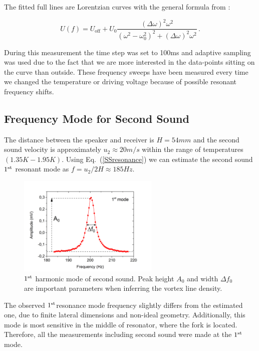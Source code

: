 The fitted full lines are Lorentzian curves with the general formula from \cite{forks}:

\begin{equation}
U(f) = U_{\text{off}} + U_0 \frac{(\Delta \omega)^2 \omega^2}{(\omega^2-\omega_0^2)^2 + (\Delta \omega)^2 \omega^2}\,.
\end{equation}

During this measurement the time step was set to 100ms and adaptive sampling was used due to the fact that we are more interested in the data-points sitting on the curve than outside. These frequency sweeps have been measured every time we changed the temperature or driving voltage because of possible resonant frequency shifts.

\subsection*{Frequency Mode for Second Sound}

The distance between the speaker and receiver is $ H= 54\unit{mm}$ and the second sound velocity is approximately $ u_2\approx20 \unit{m/s} $ within the range of temperatures $ (1.35\unit{K}-1.95\unit{K}) $. Using Eq.~(\ref{SSresonance}) we can estimate the second sound $ 1^{\mathrm{st}} $ resonant mode as $ f=u_2/2H \approx 185\unit{Hz} $.

\begin{figure}[h]
	\centering
	\vspace{-0.5cm}
	\includegraphics[width=0.6\textwidth]{graphs/SS_peak}
	\caption{$ 1^{\mathrm{st}} $ harmonic mode of second sound. Peak height $ A_0 $ and width $ \Delta f_0 $ are important parameters when inferring the vortex line density.}
\end{figure}

The observed $ 1^{\mathrm{st}} $resonance mode frequency slightly differs from the estimated one, due to finite lateral dimensions and non-ideal geometry.  Additionally, this mode is most sensitive in the middle of resonator, where the fork is located. Therefore, all the measurements including second sound were made at the $ 1^{\mathrm{st}} $ mode.

